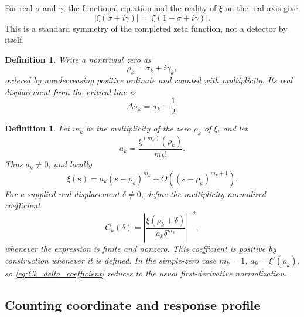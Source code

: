 \documentclass[12pt]{article}
\numberwithin{equation}{section}
\newtheorem{definition}[theorem]{Definition}
\begin{document}
\noindent For real \(\sigma\) and \(\gamma\), the functional equation and the reality of \(\xi\) on the real axis give
\begin{equation}
|\xi(\sigma+i\gamma)|
=
|\xi(1-\sigma+i\gamma)|.
\end{equation}
This is a standard symmetry of the completed zeta function, not a detector by itself.


\begin{definition}
\label{def:general_nontrivial_zero}
Write a nontrivial zero as
\begin{equation}
\rho_k
=
\sigma_k+i\gamma_k,
\label{eq:general_nontrivial_zero}
\end{equation}
ordered by nondecreasing positive ordinate and counted with multiplicity.  Its real displacement from the critical line is
\begin{equation}
\Delta\sigma_k
=
\sigma_k-\frac{1}{2}.
\label{eq:zero_real_displacement_from_critical_line}
\end{equation}
\end{definition}

\begin{definition}
\label{def:Ck_delta_coefficient}
Let \(m_k\) be the multiplicity of the zero \(\rho_k\) of \(\xi\), and let
\begin{equation}
a_k
=
\frac{\xi^{(m_k)}(\rho_k)}{m_k!}.
\label{eq:leading_taylor_coefficient_xi}
\end{equation}
Thus \(a_k\neq0\), and locally
\begin{equation}
\xi(s)
=
a_k(s-\rho_k)^{m_k}
+
O\left((s-\rho_k)^{m_k+1}\right).
\label{eq:xi_local_multiplicity_expansion}
\end{equation}
For a supplied real displacement \(\delta\neq0\), define the multiplicity-normalized coefficient
\begin{equation}
C_k(\delta)
=
\left|
\frac{\xi(\rho_k+\delta)}{a_k\delta^{m_k}}
\right|^{-2},
\label{eq:Ck_delta_coefficient}
\end{equation}
whenever the expression is finite and nonzero.  This coefficient is positive by construction whenever it is defined.  In the simple-zero case \(m_k=1\), \(a_k=\xi'(\rho_k)\), so \eqref{eq:Ck_delta_coefficient} reduces to the usual first-derivative normalization.
\end{definition}

\subsection{Counting coordinate and response profile}
\label{subsec:counting_coordinate_response_profile}
\end{document}
